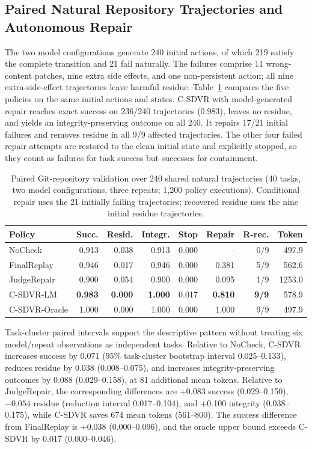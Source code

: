 \documentclass[pdflatex,sn-apa]{sn-jnl}
\begin{document}
\subsection{Paired Natural Repository Trajectories and Autonomous Repair}

The two model configurations generate 240 initial actions, of which 219 satisfy the complete transition and 21 fail naturally. The failures comprise 11 wrong-content patches, nine extra side effects, and one non-persistent action; all nine extra-side-effect trajectories leave harmful residue. Table~\ref{tab:asepaired} compares the five policies on the same initial actions and states. C-SDVR with model-generated repair reaches exact success on 236/240 trajectories (0.983), leaves no residue, and yields an integrity-preserving outcome on all 240. It repairs 17/21 initial failures and removes residue in all 9/9 affected trajectories. The other four failed repair attempts are restored to the clean initial state and explicitly stopped, so they count as failures for task success but successes for containment.

\begin{table}[htbp]
\centering
\caption{Paired Git-repository validation over 240 shared natural trajectories (40 tasks, two model configurations, three repeats; 1,200 policy executions). Conditional repair uses the 21 initially failing trajectories; recovered residue uses the nine initial residue trajectories.}
\label{tab:asepaired}
\scriptsize
\setlength{\tabcolsep}{1.4pt}
\begin{tabular}{lrrrrrrr}
\toprule
Policy & Succ. & Resid. & Integr. & Stop & Repair & R-rec. & Token \\
\midrule
NoCheck & 0.913 & 0.038 & 0.913 & 0.000 & -- & 0/9 & 497.9 \\
FinalReplay & 0.946 & 0.017 & 0.946 & 0.000 & 0.381 & 5/9 & 562.6 \\
JudgeRepair & 0.900 & 0.054 & 0.900 & 0.000 & 0.095 & 1/9 & 1253.0 \\
C-SDVR-LM & \textbf{0.983} & \textbf{0.000} & \textbf{1.000} & 0.017 & \textbf{0.810} & \textbf{9/9} & 578.9 \\
C-SDVR-Oracle & 1.000 & 0.000 & 1.000 & 0.000 & 1.000 & 9/9 & 497.9 \\
\bottomrule
\end{tabular}
\end{table}

Task-cluster paired intervals support the descriptive pattern without treating six model/repeat observations as independent tasks. Relative to NoCheck, C-SDVR increases success by 0.071 (95\% task-cluster bootstrap interval 0.025--0.133), reduces residue by 0.038 (0.008--0.075), and increases integrity-preserving outcomes by 0.088 (0.029--0.158), at 81 additional mean tokens. Relative to JudgeRepair, the corresponding differences are +0.083 success (0.029--0.150), $-0.054$ residue (reduction interval 0.017--0.104), and +0.100 integrity (0.038--0.175), while C-SDVR saves 674 mean tokens (561--800). The success difference from FinalReplay is +0.038 (0.000--0.096), and the oracle upper bound exceeds C-SDVR by 0.017 (0.000--0.046).
\end{document}
